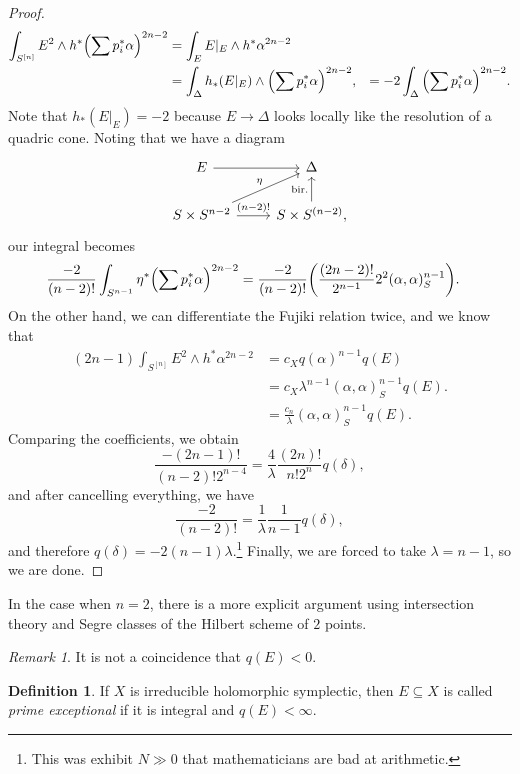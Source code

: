 \documentclass[leqno, openany]{memoir}
\theoremstyle{definition}
\newtheorem{defn}[thm]{Definition}
\theoremstyle{remark}
\newtheorem{rmk}[thm]{Remark}
\theoremstyle{plain}
\theoremstyle{definition}
\theoremstyle{remark}
\newcommand{\mr}[1]{\mathrm{#1}}
\begin{document}
\begin{proof}
\begin{align*}
        \int_{S^{[n]}} E^2 \wedge h^* \qty(\sum p_i^* \alpha)^{2n-2} &= \int_E E|_E \wedge h^* \alpha^{2n-2} \\
        &= \int_{\Delta} h_* (E|_E) \wedge \qty(\sum p_i^* \alpha)^{2n-2},
        &= -2 \int_{\Delta} \qty(\sum p_i^* \alpha)^{2n-2}.
    \end{align*}
    Note that $h_* (E|_E) = -2$ because $E \to \Delta$ looks locally like the resolution of a quadric cone. Noting that we have a diagram
    \begin{equation*}
    \begin{tikzcd}
        E \ar{r} & \Delta \\
        S \times S^{n-2} \ar{ur}{\eta} \ar{r}{(n-2)!} & S \times S^{(n-2)} \ar{u}{\mr{bir.}},
    \end{tikzcd}
    \end{equation*}
    our integral becomes
    \begin{align*}
        \frac{-2}{(n-2)!} \int_{S^{n-1}} \eta^* \qty(\sum p_i^* \alpha)^{2n-2} &= \frac{-2}{(n-2)!} \qty(\frac{(2n-2)!}{2^{n-1}} 2^2 (\alpha, \alpha)_S^{n-1}).
    \end{align*}
    On the other hand, we can differentiate the Fujiki relation twice, and we know that
    \begin{align*}
        (2n-1) \int_{S^{[n]}} E^2 \wedge h^* \alpha^{2n-2} &= c_X q(\alpha)^{n-1} q(E) \\
        &= c_X \lambda^{n-1} (\alpha, \alpha)_S^{n-1} q(E). \\
        &= \frac{c_n}{\lambda} (\alpha, \alpha)_S^{n-1} q(E).
    \end{align*}
    Comparing the coefficients, we obtain 
    \[ \frac{-(2n-1)!}{(n-2)! 2^{n-4}} = \frac{4}{\lambda} \frac{(2n)!}{n!2^n} q(\delta), \]
    and after cancelling everything, we have
    \[ \frac{-2}{(n-2)!} = \frac{1}{\lambda} \frac{1}{n-1} q(\delta), \]
    and therefore $q(\delta) = -2(n-1)\lambda$.\footnote{This was exhibit $N \gg 0$ that mathematicians are bad at arithmetic.} Finally, we are forced to take $\lambda = n-1$, so we are done.
\end{proof}

In the case when $n=2$, there is a more explicit argument using intersection theory and Segre classes of the Hilbert scheme of $2$ points.

\begin{rmk}
    It is not a coincidence that $q(E) < 0$.
\end{rmk}

\begin{defn}
    If $X$ is irreducible holomorphic symplectic, then $E \subseteq X$ is called \textit{prime exceptional} if it is integral and $q(E) < \infty$.
\end{defn}
\end{document}
